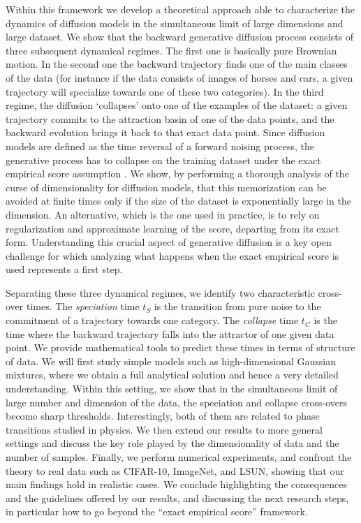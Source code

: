 \documentclass[10pt,twocolumn]{article}
\begin{document}
Within this framework we develop a theoretical approach able to characterize the dynamics of diffusion models in the simultaneous limit of large dimensions and large dataset. We show that the backward generative diffusion process consists of three subsequent dynamical regimes.  
 The first one is basically pure Brownian motion. In the second one  the backward trajectory finds one of the main classes of the data (for instance if the data consists of images of horses and cars, a given trajectory will specialize towards one of these two categories). In the third regime, the diffusion ‘collapses’ onto one of the examples of the dataset: a given trajectory commits to the attraction basin of one of the data points, and the backward evolution brings it back to that exact data point. Since  diffusion models are defined as the time reversal of a forward noising process, the generative process has to collapse on the training dataset under the exact empirical score assumption \cite{cattiaux2021time,haussmann1986time}. We show, by performing a thorough analysis of the curse of dimensionality for diffusion models, that this memorization can be avoided at finite times only if the size of the dataset is exponentially large in the dimension. An alternative, which is the one used in practice, is to rely on regularization and approximate learning of the score, departing from its exact form.
Understanding this crucial aspect of generative diffusion is a key open challenge \cite{kadkhodaie2023generalization,yoon2023diffusion,cui2023analysis} for which analyzing what happens when the exact empirical score is used represents a first step.  


Separating these three dynamical regimes, we identify two characteristic cross-over times. The  {\it speciation} time $t_S$ is the transition from pure noise  to the commitment of a trajectory towards one category. The {\it collapse} time $t_C$ is the time where the backward trajectory falls into the attractor of one given data point. We provide mathematical tools to predict these times in terms of structure of
data. We will first study simple models such as high-dimensional Gaussian mixtures, where we obtain a full analytical solution and hence a very detailed understanding. Within this setting, we show that in the simultaneous limit of large number and dimension of the data, the speciation and collapse cross-overs become sharp thresholds. Interestingly, both of them are related to phase transitions studied in physics. We  then extend our results to more general settings and discuss the key role played by the dimensionality of data and the number of samples. Finally, we  perform numerical experiments, and confront the theory to real data such as CIFAR-10, ImageNet, and LSUN, showing that our main findings hold in realistic cases. We  conclude highlighting the consequences and the guidelines offered by our results, and discussing the next research steps, in particular how to go beyond the ``exact empirical score'' framework.   
\end{document}

